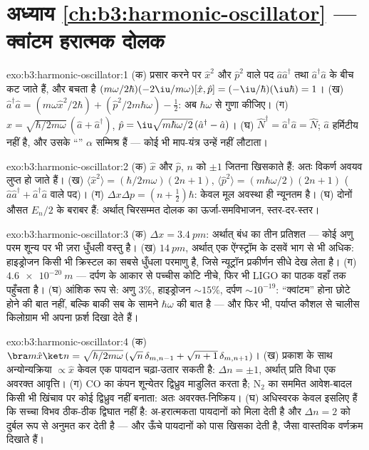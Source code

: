 \section*{अध्याय \ref{ch:b3:harmonic-oscillator} --- क्वांटम हरात्मक दोलक}

\begin{solution}{exo:b3:harmonic-oscillator:1}
(क) प्रसार करने पर $\hat x^2$ और $\hat p^2$ वाले पद
$\hat a\hat a^\dagger$ तथा $\hat a^\dagger\hat a$ के बीच कट जाते हैं, और बचता है
$(m\omega/2\hbar)(-2\iu/m\omega)[\hat x, \hat p] =
(-\iu/\hbar)(\iu\hbar) = 1$। (ख) $\hat a^\dagger\hat a = (m\omega\hat x^2/2\hbar) +
(\hat p^2/2m\hbar\omega) - \tfrac12$: अब $\hbar\omega$ से गुणा कीजिए। (ग)
$\hat x = \sqrt{\hbar/2m\omega}\,(\hat a + \hat a^\dagger)$, $\hat p
= \iu\sqrt{m\hbar\omega/2}\,(\hat a^\dagger - \hat a)$। (घ) $\hat
N^\dagger = \hat a^\dagger\hat a = \hat N$; $\hat a$ हर्मिटीय नहीं
है, और उसके ``'' $\alpha$ सम्मिश्र हैं --- कोई भी
माप-यंत्र उन्हें नहीं लौटाता।
\end{solution}

\begin{solution}{exo:b3:harmonic-oscillator:2}
(क) $\hat x$ और $\hat p$, $n$ को $\pm1$ जितना खिसकाते हैं: अतः विकर्ण
अवयव लुप्त हो जाते हैं। (ख) $\langle\hat x^2\rangle = (\hbar/2m\omega)(2n + 1)$,
$\langle\hat p^2\rangle = (m\hbar\omega/2)(2n + 1)$ ($\hat
a\hat a^\dagger + \hat a^\dagger\hat a$ वाले पद)। (ग) $\Delta x\Delta p
= (n + \tfrac12)\hbar$: केवल मूल अवस्था ही न्यूनतम है। (घ) दोनों
औसत $E_n/2$ के बराबर हैं: अर्थात् चिरसम्मत दोलक का ऊर्जा-समविभाजन,
स्तर-दर-स्तर।
\end{solution}

\begin{solution}{exo:b3:harmonic-oscillator:3}
(क) $\Delta x = \qty{3.4}{pm}$: अर्थात् बंध का तीन प्रतिशत --- कोई
अणु परम शून्य पर भी ज़रा धुँधली वस्तु है। (ख)
$\qty{14}{pm}$, अर्थात् एक ऐंग्स्ट्रॉम के दसवें भाग से भी अधिक:
हाइड्रोजन किसी भी क्रिस्टल का सबसे धुँधला परमाणु है, जिसे न्यूट्रॉन
प्रकीर्णन सीधे देख लेता है। (ग) $\qty{4.6e-20}{m}$ --- दर्पण के आकार
से पच्चीस कोटि नीचे, फिर भी LIGO का पाठक वहाँ तक पहुँचता है। (घ)
आंशिक रूप से: अणु $3\%$, हाइड्रोजन $\sim15\%$, दर्पण $\sim10^{-19}$:
``क्वांटम'' होना छोटे होने की बात नहीं, बल्कि बाकी सब के सामने
$\hbar\omega$ की बात है --- और फिर भी, पर्याप्त कौशल से चालीस
किलोग्राम भी अपना फ़र्श दिखा देते हैं।
\end{solution}

\begin{solution}{exo:b3:harmonic-oscillator:4}
(क) $\bra m\hat x\ket n = \sqrt{\hbar/2m\omega}\,(\sqrt n\,
\delta_{m,n-1} + \sqrt{n + 1}\,\delta_{m,n+1})$। (ख) प्रकाश के साथ
अन्योन्यक्रिया $\propto\hat x$ केवल एक पायदान चढ़ा-उतार सकती है: $\Delta n =
\pm1$, अर्थात् प्रति विधा एक अवरक्त आवृत्ति। (ग) CO का कंपन
शून्येतर द्विध्रुव माडुलित करता है; N$_2$ का सममित आवेश-बादल किसी भी
खिंचाव पर कोई द्विध्रुव नहीं बनाता: अतः अवरक्त-निष्क्रिय। (घ)
अधिस्वरक केवल इसलिए हैं कि सच्चा विभव ठीक-ठीक द्विघात नहीं है:
अ-हरात्मकता पायदानों को मिला देती है और $\Delta n = 2$ को दुर्बल रूप
से अनुमत कर देती है --- और ऊँचे पायदानों को पास खिसका देती है, जैसा
वास्तविक वर्णक्रम दिखाते हैं।
\end{solution}

